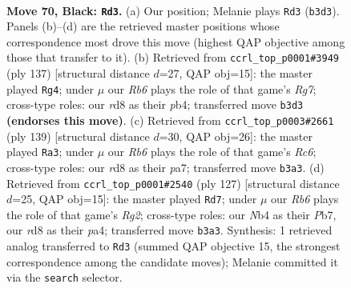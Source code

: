 \documentclass[11pt]{article}
\begin{document}
\clearpage

\begin{figure}[p]\centering
\begin{subfigure}{0.46\textwidth}\centering
\resizebox{\linewidth}{!}{%
\newchessgame
\chessboard[
  setfen={3R4/1p2R2p/1k4pP/5p2/pn3P2/1r6/7K/8 b - - 5 70},
  showmover=false,
  pgfstyle=straightmove, color=movearrow, markmove={b3-d3}
]}
\caption{}
\end{subfigure}\hfill
\begin{subfigure}{0.46\textwidth}\centering
\resizebox{\linewidth}{!}{%
\newchessgame
\chessboard[
  setfen={8/3k4/5Rp1/5p1p/1P3P1P/8/6r1/2K5 b - - 4 69},
  showmover=false,
  pgfstyle=straightmove, color=movearrow, markmove={g2-g4}
]}
\caption{}
\end{subfigure}
\\[4pt]
\begin{subfigure}{0.46\textwidth}\centering
\resizebox{\linewidth}{!}{%
\newchessgame
\chessboard[
  setfen={8/P3kp2/1R1p4/2pP4/1p2K3/2r5/5P2/8 b - - 4 70},
  showmover=false,
  pgfstyle=straightmove, color=movearrow, markmove={c3-a3}
]}
\caption{}
\end{subfigure}\hfill
\begin{subfigure}{0.46\textwidth}\centering
\resizebox{\linewidth}{!}{%
\newchessgame
\chessboard[
  setfen={7k/1p4r1/4pR1p/p2p3P/P7/2P4K/1P6/8 b - - 1 64},
  showmover=false,
  pgfstyle=straightmove, color=movearrow, markmove={g7-d7}
]}
\caption{}
\end{subfigure}
\caption{\textbf{Move 70, Black: \texttt{Rd3}.} (a) Our position; Melanie plays \texttt{Rd3} (\texttt{b3d3}). Panels (b)--(d) are the retrieved master positions whose correspondence most drove this move (highest QAP objective among those that transfer to it). (b) Retrieved from \texttt{ccrl\_top\_p0001\#3949} (ply 137) [structural distance $d$=27, QAP obj=15]: the master played \texttt{Rg4}; under $\mu$ our \emph{Rb6} plays the role of that game's \emph{Rg7}; cross-type roles: our \emph{r}d8 as their \emph{p}b4; transferred move \texttt{b3d3} \textbf{(endorses this move)}. (c) Retrieved from \texttt{ccrl\_top\_p0003\#2661} (ply 139) [structural distance $d$=30, QAP obj=26]: the master played \texttt{Ra3}; under $\mu$ our \emph{Rb6} plays the role of that game's \emph{Rc6}; cross-type roles: our \emph{r}d8 as their \emph{p}a7; transferred move \texttt{b3a3}. (d) Retrieved from \texttt{ccrl\_top\_p0001\#2540} (ply 127) [structural distance $d$=25, QAP obj=15]: the master played \texttt{Rd7}; under $\mu$ our \emph{Rb6} plays the role of that game's \emph{Rg2}; cross-type roles: our \emph{N}b4 as their \emph{P}b7, our \emph{r}d8 as their \emph{p}a4; transferred move \texttt{b3a3}. Synthesis: 1 retrieved analog transferred to \texttt{Rd3} (summed QAP objective 15, the strongest correspondence among the candidate moves); Melanie committed it via the \texttt{search} selector.}
\label{fig:thought-m139}
\end{figure}
\end{document}
